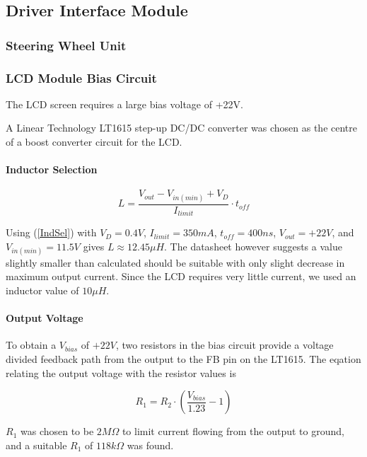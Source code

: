 \subsection{Driver Interface Module}


\subsubsection{Steering Wheel Unit}


\subsubsection{LCD Module Bias Circuit}

The LCD screen requires a large bias voltage of +22V.

A Linear Technology LT1615 step-up DC/DC converter was chosen as the centre of a boost converter circuit for the LCD.


\paragraph{Inductor Selection}

\begin{equation}
L=\frac{V_{out}-V_{in(min)}+V_{D}}{I_{limit}}\cdot t_{off}\label{IndSel}
\end{equation}


Using (\ref{IndSel}) with $V_{D}=0.4V$, $I_{limit}=350mA$, $t_{off}=400ns$, $V_{out}=+22V$, and $V_{in(min)}=11.5V$ gives $L\approx12.45\mu{H}$. The datasheet however suggests a value slightly smaller than calculated should be suitable with only slight decrease in maximum output current. Since the LCD requires very little current, we used an inductor value of $10\mu H$.


\paragraph{Output Voltage}

To obtain a $V_{bias}$ of $+22V$, two resistors in the bias circuit provide a voltage divided feedback path from the output to the FB pin on the LT1615. The eqation relating the output voltage with the resistor values is

\begin{equation}
R_{1}=R_{2}\cdot\left(\frac{V_{bias}}{1.23}-1\right)
\end{equation}

 $R_{1}$ was chosen to be $2M\Omega$ to limit current flowing from the output to ground, and a suitable $R_{1}$ of $118k\Omega$ was found.


